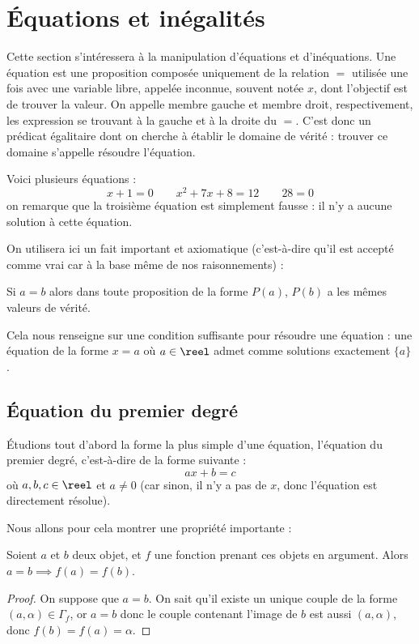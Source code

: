 \section{\'Equations et inégalités}

Cette section s'intéressera à la manipulation d'équations et d'inéquations. Une équation est une proposition composée uniquement de la relation \og $=$\fg{} utilisée une fois avec une variable libre, appelée inconnue, souvent notée $x$, dont l'objectif est de trouver la valeur. On appelle membre gauche et membre droit, respectivement, les expression se trouvant à la gauche et à la droite du \og $=$\fg{}. C'est donc un prédicat égalitaire dont on cherche à établir le domaine de vérité : trouver ce domaine s'appelle résoudre l'équation.

\begin{expl}
    Voici plusieurs équations :
    $$x+1=0 \qquad x^2+7x+8=12 \qquad 28=0$$
    on remarque que la troisième équation est simplement fausse : il n'y a aucune solution à cette équation.
\end{expl}

On utilisera ici un fait important et axiomatique (c'est-à-dire qu'il est accepté comme vrai car à la base même de nos raisonnements) :

\begin{ax}
    Si $a=b$ alors dans toute proposition de la forme $P(a)$, $P(b)$ a les mêmes valeurs de vérité.
\end{ax}

Cela nous renseigne sur une condition suffisante pour résoudre une équation : une équation de la forme $x=a$ où $a\in\reel$ admet comme solutions exactement $\{a\}$.

\subsection{\'Equation du premier degré}\label{equa1d}

\'Etudions tout d'abord la forme la plus simple d'une équation, l'équation du premier degré, c'est-à-dire de la forme suivante : $$ ax+b = c$$ où $a,b,c\in\reel$ et $a\neq 0$ (car sinon, il n'y a pas de $x$, donc l'équation est directement résolue).

Nous allons pour cela montrer une propriété importante :

\begin{prop}
    Soient $a$ et $b$ deux objet, et $f$ une fonction prenant ces objets en argument. Alors $a=b\implies f(a)=f(b)$.
\end{prop}
\begin{proof}
    On suppose que $a=b$.
    On sait qu'il existe un unique couple de la forme $(a,\alpha)\in\Gamma_f$, or $a=b$ donc le couple contenant l'image de $b$ est aussi $(a,\alpha)$, donc $f(b)=f(a)=\alpha$.
\end{proof}

